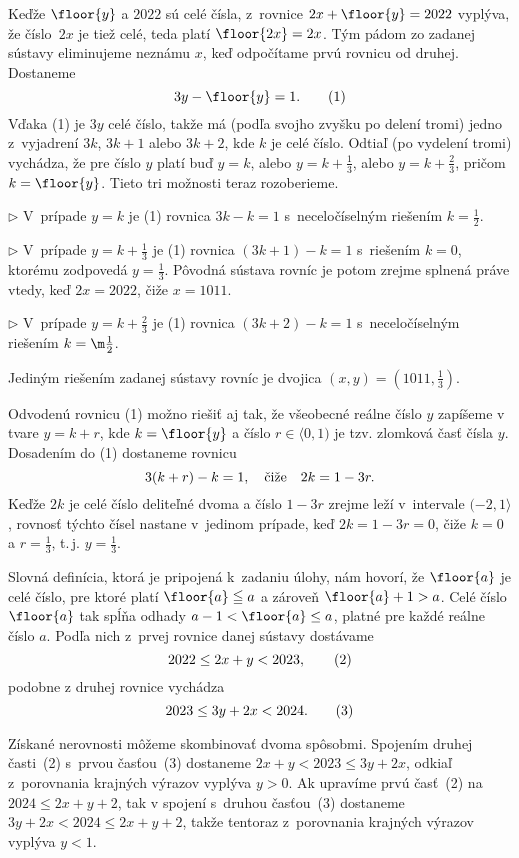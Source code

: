 ﻿{%
Keďže $\floor{y}$ a $2022$ sú celé čísla,
z~rovnice $2x+\floor{y}=2022$ vyplýva, že číslo~$2x$ je tiež
celé, teda platí $\floor{2x}=2x$. Tým pádom zo zadanej sústavy
eliminujeme neznámu $x$, keď odpočítame prvú rovnicu od druhej.
Dostaneme
$$
3y-\floor{y}=1.
\tag1
$$
Vďaka (1) je $3y$ celé číslo, takže má (podľa svojho zvyšku po delení
tromi) jedno z~vyjadrení $3k$, $3k+1$ alebo $3k+2$, kde $k$ je celé
číslo. Odtiaľ (po vydelení tromi) vychádza, že pre číslo $y$ platí
buď $y=k$, alebo $y=k+\frac13$, alebo $y=k+\frac23$,
pričom $k=\floor{y}$. Tieto tri možnosti teraz rozoberieme.
\item{$\triangleright$} V~prípade $y=k$ je (1) rovnica $3k-k=1$ s~neceločíselným riešením
$k=\frac12$.
\item{$\triangleright$} V~prípade $y=k+\frac13$ je (1) rovnica $(3k+1)-k=1$ s~riešením
$k=0$, ktorému zodpovedá $y=\frac13$. Pôvodná sústava rovníc je potom
zrejme splnená práve vtedy, keď $2x=2022$, čiže $x=1011$.
\item{$\triangleright$} V~prípade $y=k+\frac23$ je (1) rovnica $(3k+2)-k=1$
s~neceločíselným riešením $k=\m\frac12$.

   \Zav
Jediným riešením zadanej sústavy rovníc je dvojica $(x,y)=(1011,\frac13)$.

   \Pozn
Odvodenú rovnicu (1) možno riešiť aj tak, že všeobecné reálne číslo
$y$ zapíšeme v tvare $y=k+r$, kde $k=\floor{y}$ a číslo
$r\in\langle0,1)$ je tzv. zlomková časť čísla $y$. Dosadením do
(1) dostaneme rovnicu
$$
3(k+r)-k=1,\quad\hbox{čiže}\quad 2k=1-3r.
$$
Keďže $2k$ je celé číslo deliteľné dvoma a číslo $1-3r$ zrejme
leží v~intervale $({-2},1\rangle$, rovnosť týchto čísel nastane
v~jedinom prípade, keď $2k=1-3r=0$, čiže $k=0$ a $r=\frac13$, t.\,j.
$y=\frac13$.

  \Jres
Slovná definícia, ktorá je pripojená k~zadaniu úlohy, nám
hovorí, že $\floor{a}$ je celé číslo, pre ktoré platí $\floor{a}\leqq
a$ a zároveň $\floor{a}+1>a$. Celé číslo $\floor{a}$ tak spĺňa
odhady $a-1<\floor{a}\leq a$, platné pre každé reálne číslo $a$.
Podľa nich z~prvej rovnice danej sústavy dostávame
$$
{2022\leq 2x+y<2023},
\tag2
$$
podobne z druhej rovnice vychádza
$$
{2023\leq 3y+2x< 2024}.
\tag3
$$

Získané nerovnosti môžeme skombinovať dvoma spôsobmi.
Spojením druhej časti~(2) s~prvou časťou~(3) dostaneme
${2x+y <2023\leq 3y+2x}$, odkiaľ z~porovnania krajných výrazov
vyplýva $y>0$. Ak upravíme prvú časť~(2)
na ${2024\leq 2x+y+2}$, tak v spojení s~druhou časťou~(3)
dostaneme ${3y+2x<2024\leq 2x+y+2}$, takže tentoraz
z~porovnania krajných výrazov vyplýva $y<1$.

}
